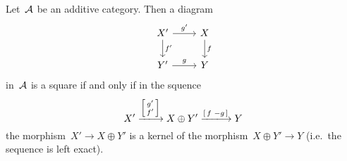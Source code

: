 \section{}

\begin{proposition}
  \label{characterization of pullbacks}
  Let~$\mathcal{A}$ be an additive category.
  Then a diagram
  \[
    \begin{tikzcd}
        X'
        \arrow{r}[above]{g'}
        \arrow{d}[right]{f'}
      & X
        \arrow{d}[right]{f}
      \\
        Y'
        \arrow{r}[above]{g}
      & Y
    \end{tikzcd}
  \]
  in~$\mathcal{A}$ is a {\pb} square if and only if in the squence
  \begin{equation}
    \label{left exact sequence}
      X'
    \xlongto{ \begin{bsmallmatrix} g' \\ f' \end{bsmallmatrix} }
      X \oplus Y'
    \xlongto{ \begin{bsmallmatrix} f & -g \end{bsmallmatrix} }
      Y
  \end{equation}
  the morphism~$X' \to X \oplus Y'$ is a kernel of the morphism~$X \oplus Y' \to Y$ (i.e.\ the sequence is left exact).
\end{proposition} 

